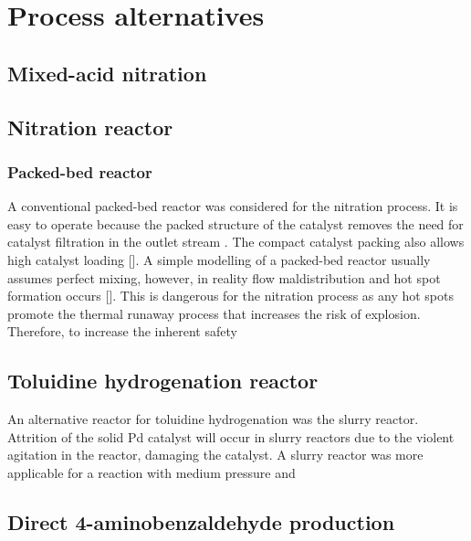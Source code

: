 \section{Process alternatives}
\label{app:alternatives}

\subsection{Mixed-acid nitration}
\label{mixed}

\subsection{Nitration reactor}
\label{nitrationreactor}
\subsubsection{Packed-bed reactor}
A conventional packed-bed reactor was considered for the nitration process. It is easy to operate because the packed structure of the catalyst removes the need for catalyst filtration in the outlet stream . The compact catalyst packing also allows high catalyst loading []. A simple modelling of a packed-bed reactor usually assumes perfect mixing, however, in reality flow maldistribution and hot spot formation occurs []. This is dangerous for the nitration process as any hot spots promote the thermal runaway process that increases the risk of explosion. Therefore, to increase the inherent safety

\subsection{Toluidine hydrogenation reactor}
\label{toluidine}
An alternative reactor for toluidine hydrogenation was the slurry reactor. Attrition of the solid Pd catalyst will occur in slurry reactors due to the violent agitation in the reactor, damaging the catalyst. A slurry reactor was more applicable for a reaction with medium pressure and 


\subsection{Direct 4-aminobenzaldehyde production}
\label{direct}